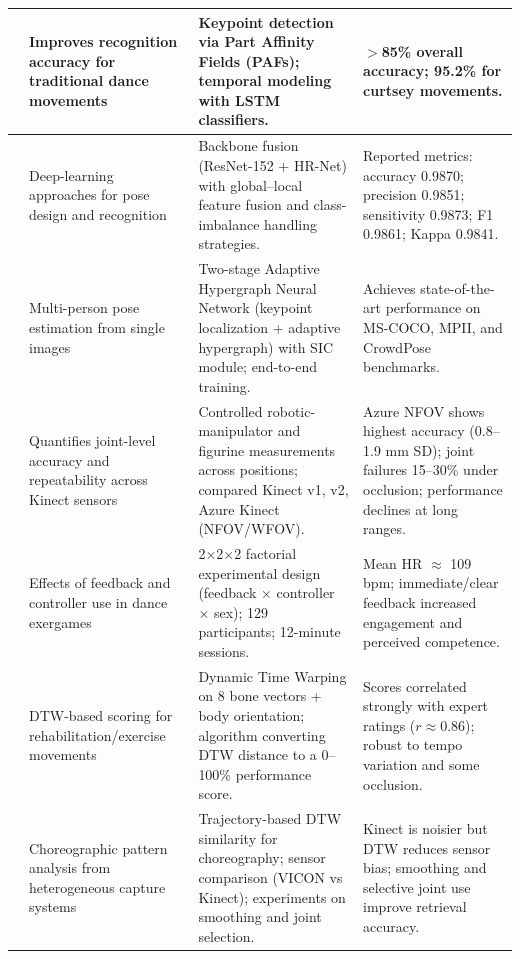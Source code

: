 \begin{longtable}{|p{2.5cm}|p{2.5cm}|p{2.5cm}|p{2.5cm}|}
\emph{\citet{leililiu2023dancemovement}} & Improves recognition accuracy for traditional dance movements & Keypoint detection via Part Affinity Fields (PAFs); temporal modeling with LSTM classifiers. & \(>\)85\% overall accuracy; 95.2\% for curtsey movements. \\ \hline

\emph{\citet{zheng2023deeplearningbasedhumanpose}} & Deep-learning approaches for pose design and recognition & Backbone fusion (ResNet-152 + HR-Net) with global–local feature fusion and class-imbalance handling strategies. & Reported metrics: accuracy 0.9870; precision 0.9851; sensitivity 0.9873; F1 0.9861; Kappa 0.9841. \\ \hline

\emph{\citet{xu_adaptive_2022}} & Multi-person pose estimation from single images & Two-stage Adaptive Hypergraph Neural Network (keypoint localization + adaptive hypergraph) with SIC module; end-to-end training. & Achieves state-of-the-art performance on MS-COCO, MPII, and CrowdPose benchmarks. \\ \hline

\emph{\citet{tolgyessy2021skeletontracking}} & Quantifies joint-level accuracy and repeatability across Kinect sensors & Controlled robotic-manipulator and figurine measurements across positions; compared Kinect v1, v2, Azure Kinect (NFOV/WFOV). & Azure NFOV shows highest accuracy (0.8--1.9 mm SD); joint failures 15--30\% under occlusion; performance declines at long ranges. \\ \hline

\emph{\citet{linjustdance}} & Effects of feedback and controller use in dance exergames & 2\(\times\)2\(\times\)2 factorial experimental design (feedback \(\times\) controller \(\times\) sex); 129 participants; 12-minute sessions. & Mean HR \(\approx\) 109 bpm; immediate/clear feedback increased engagement and perceived competence. \\ \hline

\emph{\citet{yuxiong2019}} & DTW-based scoring for rehabilitation/exercise movements & Dynamic Time Warping on 8 bone vectors + body orientation; algorithm converting DTW distance to a 0--100\% performance score. & Scores correlated strongly with expert ratings (\(r \approx 0.86\)); robust to tempo variation and some occlusion. \\ \hline

\emph{\citet{trallis2019}} & Choreographic pattern analysis from heterogeneous capture systems & Trajectory-based DTW similarity for choreography; sensor comparison (VICON vs Kinect); experiments on smoothing and joint selection. & Kinect is noisier but DTW reduces sensor bias; smoothing and selective joint use improve retrieval accuracy. \\ \hline


\end{longtable}
